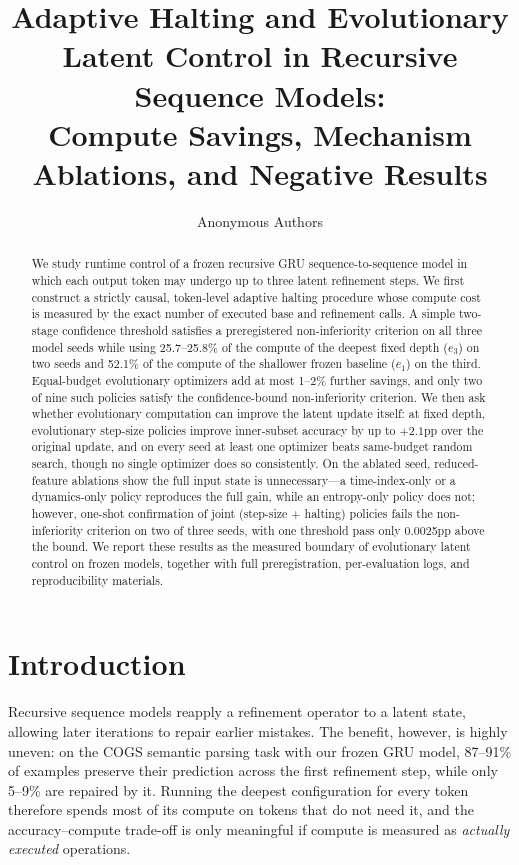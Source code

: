 \documentclass[11pt]{article}
\title{Adaptive Halting and Evolutionary Latent Control in Recursive Sequence Models:\\Compute Savings, Mechanism Ablations, and Negative Results}
\author{Anonymous Authors}
\begin{document}
\maketitle

\begin{abstract}
We study runtime control of a frozen recursive GRU sequence-to-sequence model in which each output token may undergo up to three latent refinement steps. We first construct a strictly causal, token-level adaptive halting procedure whose compute cost is measured by the exact number of executed base and refinement calls. A simple two-stage confidence threshold satisfies a preregistered non-inferiority criterion on all three model seeds while using 25.7--25.8\% of the compute of the deepest fixed depth ($e_3$) on two seeds and 52.1\% of the compute of the shallower frozen baseline ($e_1$) on the third. Equal-budget evolutionary optimizers add at most 1--2\% further savings, and only two of nine such policies satisfy the confidence-bound non-inferiority criterion. We then ask whether evolutionary computation can improve the latent update itself: at fixed depth, evolutionary step-size policies improve inner-subset accuracy by up to $+2.1$pp over the original update, and on every seed at least one optimizer beats same-budget random search, though no single optimizer does so consistently. On the ablated seed, reduced-feature ablations show the full input state is unnecessary---a time-index-only or a dynamics-only policy reproduces the full gain, while an entropy-only policy does not; however, one-shot confirmation of joint (step-size + halting) policies fails the non-inferiority criterion on two of three seeds, with one threshold pass only 0.0025pp above the bound. We report these results as the measured boundary of evolutionary latent control on frozen models, together with full preregistration, per-evaluation logs, and reproducibility materials.
\end{abstract}

\section{Introduction}
\label{sec:intro}

Recursive sequence models reapply a refinement operator to a latent state, allowing later iterations to repair earlier mistakes. The benefit, however, is highly uneven: on the COGS semantic parsing task with our frozen GRU model, 87--91\% of examples preserve their prediction across the first refinement step, while only 5--9\% are repaired by it. Running the deepest configuration for every token therefore spends most of its compute on tokens that do not need it, and the accuracy--compute trade-off is only meaningful if compute is measured as \emph{actually executed} operations.
\end{document}
